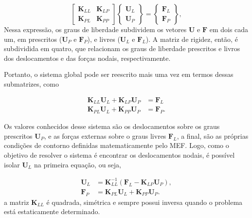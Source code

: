 \begin{equation}
    \begin{bmatrix}
        \bm{K}_{LL} & \bm{K}_{LP} \\
        \bm{K}_{PL} & \bm{K}_{PP}
    \end{bmatrix} 
    \begin{Bmatrix}
        \bm{U}_L \\ \bm{U}_P
    \end{Bmatrix}
    = \begin{Bmatrix}
        \bm{F}_L \\ \bm{F}_P
    \end{Bmatrix},
\end{equation}
Nessa expressão, os graus de liberdade subdividem os vetores $\bm{U}$ e $\bm{F}$ em dois cada um, em prescritos ($\bm{U}_P$ e $\bm{F}_P$), e livres ($\bm{U}_L$ e $\bm{F}_L$). A matriz de rigidez, então, é subdividida em quatro, que relacionam os graus de liberdade prescritos e livros dos deslocamentos e das forças nodais, respectivamente.

Portanto, o sistema global pode ser reescrito mais uma vez em termos dessas submatrizes, como

\begin{align}
    \bm{K}_{LL} \bm{U}_L + \bm{K}_{LP} \bm{U}_P &= \bm{F}_L \\
    \bm{K}_{PL} \bm{U}_L + \bm{K}_{PP} \bm{U}_P &= \bm{F}_P.
\end{align}

Os valores conhecidos desse sistema são os deslocamentos sobre os graus prescritos $\bm{U}_P$, e as forças externas sobre o graus livres $\bm{F}_L$, a final, são as próprias condições de contorno definidas matematicamente pelo MEF. Logo, como o objetivo de resolver o sistema é encontrar os deslocamentos nodais, é possível isolar $\bm{U}_L$ na primeira equação, ou seja,

\begin{align}
    \bm{U}_L &= \bm{K}_{LL}^{-1} (\bm{F}_L - \bm{K}_{LP} \bm{U}_P), \\
    \bm{F}_P &= \bm{K}_{PL} \bm{U}_L + \bm{K}_{PP} \bm{U}_P.
\end{align}
a matriz $\bm{K}_{LL}$ é quadrada, simétrica e sempre possui inversa quando o problema está estaticamente determinado. \cite{rao}

